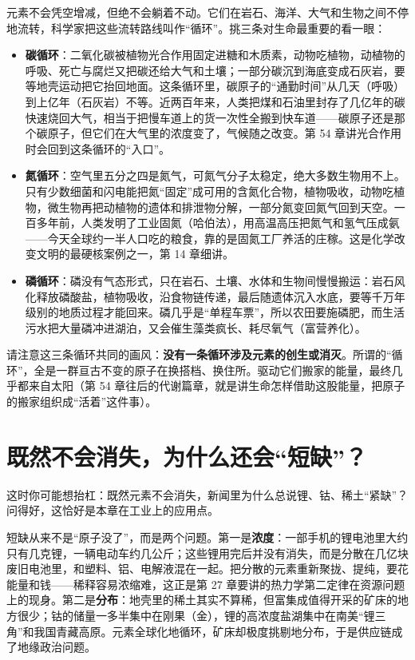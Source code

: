元素不会凭空增减，但绝不会躺着不动。它们在岩石、海洋、大气和生物之间不停地流转，科学家把这些流转路线叫作“循环”。挑三条对生命最重要的看一眼：

\begin{itemize}[itemsep=2pt]
\item \textbf{碳循环}：二氧化碳被植物光合作用固定进糖和木质素，动物吃植物，动植物的呼吸、死亡与腐烂又把碳还给大气和土壤；一部分碳沉到海底变成石灰岩，要等地壳运动把它抬回地面。这条循环里，碳原子的“通勤时间”从几天（呼吸）到上亿年（石灰岩）不等。近两百年来，人类把煤和石油里封存了几亿年的碳快速烧回大气，相当于把慢车道上的货一次性全搬到快车道——碳原子还是那个碳原子，但它们在大气里的浓度变了，气候随之改变。第 54 章讲光合作用时会回到这条循环的“入口”。
\item \textbf{氮循环}：空气里五分之四是氮气，可氮气分子太稳定，绝大多数生物用不上。只有少数细菌和闪电能把氮“固定”成可用的含氮化合物，植物吸收，动物吃植物，微生物再把动植物的遗体和排泄物分解，一部分氮变回氮气回到天空。一百多年前，人类发明了工业固氮（哈伯法），用高温高压把氮气和氢气压成氨——今天全球约一半人口吃的粮食，靠的是固氮工厂养活的庄稼。这是化学改变文明的最硬核案例之一，第 14 章细讲。
\item \textbf{磷循环}：磷没有气态形式，只在岩石、土壤、水体和生物间慢慢搬运：岩石风化释放磷酸盐，植物吸收，沿食物链传递，最后随遗体沉入水底，要等千万年级别的地质过程才能回来。磷几乎是“单程车票”，所以农田要施磷肥，而生活污水把大量磷冲进湖泊，又会催生藻类疯长、耗尽氧气（富营养化）。
\end{itemize}

请注意这三条循环共同的画风：\textbf{没有一条循环涉及元素的创生或消灭}。所谓的“循环”，全是一群亘古不变的原子在换搭档、换住所。驱动它们搬家的能量，最终几乎都来自太阳（第 54 章往后的代谢篇章，就是讲生命怎样借助这股能量，把原子的搬家组织成“活着”这件事）。

\section{既然不会消失，为什么还会“短缺”？}

这时你可能想抬杠：既然元素不会消失，新闻里为什么总说锂、钴、稀土“紧缺”？问得好，这恰好是本章在工业上的应用点。

短缺从来不是“原子没了”，而是两个问题。第一是\textbf{浓度}：一部手机的锂电池里大约只有几克锂，一辆电动车约几公斤；这些锂用完后并没有消失，而是分散在几亿块废旧电池里，和塑料、铝、电解液混在一起。把分散的元素重新聚拢、提纯，要花能量和钱——稀释容易浓缩难，这正是第 27 章要讲的热力学第二定律在资源问题上的现身。第二是\textbf{分布}：地壳里的稀土其实不算稀，但富集成值得开采的矿床的地方很少；钴的储量一多半集中在刚果（金），锂的高浓度盐湖集中在南美“锂三角”和我国青藏高原。元素全球化地循环，矿床却极度挑剔地分布，于是供应链成了地缘政治问题。

